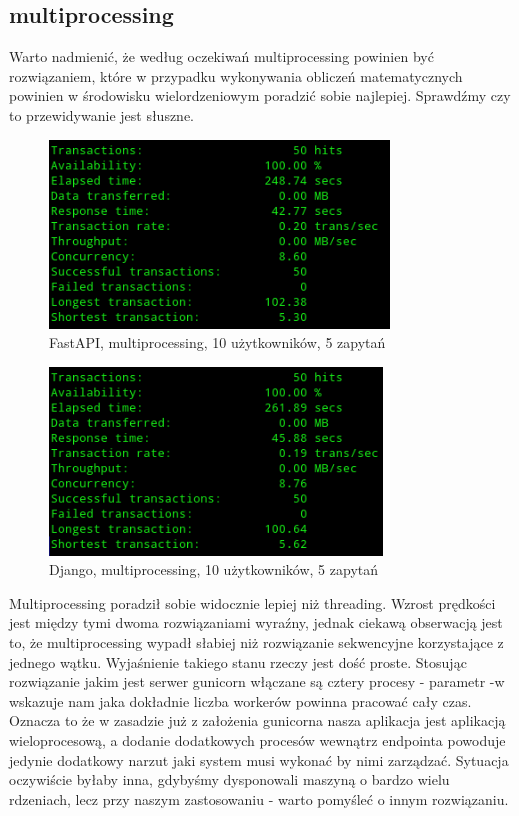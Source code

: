 \subsection{multiprocessing}
Warto nadmienić, że według oczekiwań multiprocessing powinien być rozwiązaniem, które w przypadku wykonywania obliczeń matematycznych powinien w środowisku wielordzeniowym poradzić sobie najlepiej. Sprawdźmy czy to przewidywanie jest słuszne.
\begin{figure}[H]
    \includegraphics[height=50mm]{zdjecia/10_math_process_fast}
    \centering
    \caption{FastAPI, multiprocessing, 10 użytkowników, 5 zapytań}
\end{figure}

\begin{figure}[H]
    \includegraphics[height=50mm]{zdjecia/10_math_process_django}
    \centering
    \caption{Django, multiprocessing, 10 użytkowników, 5 zapytań}
\end{figure}
Multiprocessing poradził sobie widocznie lepiej niż threading. Wzrost prędkości jest między tymi dwoma rozwiązaniami wyraźny, jednak ciekawą obserwacją jest to, że multiprocessing wypadł słabiej niż rozwiązanie sekwencyjne korzystające z jednego wątku. Wyjaśnienie takiego stanu rzeczy jest dość proste. Stosując rozwiązanie jakim jest serwer gunicorn włączane są cztery procesy - parametr -w wskazuje nam jaka dokładnie liczba workerów powinna pracować cały czas. Oznacza to że w zasadzie już z założenia gunicorna nasza aplikacja jest aplikacją wieloprocesową, a dodanie dodatkowych procesów wewnątrz endpointa powoduje jedynie dodatkowy narzut jaki system musi wykonać by nimi zarządzać. Sytuacja oczywiście byłaby inna, gdybyśmy dysponowali maszyną o bardzo wielu rdzeniach, lecz przy naszym zastosowaniu - warto pomyśleć o innym rozwiązaniu.

